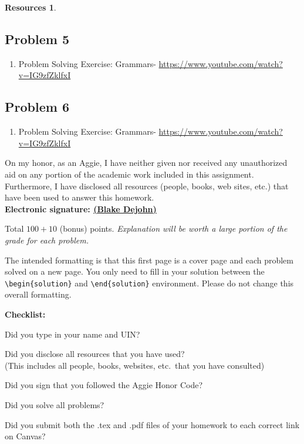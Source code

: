 \documentclass{article}
\theoremstyle{definition}
\newtheorem*{solution}{Solution}
\newtheorem*{resources}{Resources}
\newcommand{\honor}{\noindent On my honor, as an Aggie, I have neither
  given nor received any unauthorized aid on any portion of the
  academic work included in this assignment. Furthermore, I have
  disclosed all resources (people, books, web sites, etc.) that have
  been used to answer this homework. \\[2ex]
 \textbf{Electronic signature: \underline{ (Blake Dejohn) } } } %
\newcommand{\checklist}{\noindent\textbf{Checklist:}
\begin{compactitem}[$\Box$] 
\item [\checkmark] Did you type in your name and UIN? 
\item [\checkmark] Did you disclose all resources that you have used? \\
(This includes all people, books, websites, etc.\ that you have consulted)
\item [\checkmark] Did you sign that you followed the Aggie Honor Code? 
\item [\checkmark] Did you solve all problems? 
\item [\checkmark] Did you submit both the .tex and .pdf files of your homework to each correct link on Canvas? 
\end{compactitem}
}
\begin{document}
\begin{resources}
\subsection*{Problem 5}
\begin{enumerate}
\item Problem Solving Exercise: Grammars- \url{https://www.youtube.com/watch?v=IG9zfZklfxI}
\end{enumerate}
\subsection*{Problem 6}
\begin{enumerate}
\item Problem Solving Exercise: Grammars- \url{https://www.youtube.com/watch?v=IG9zfZklfxI}
\end{enumerate}
\end{resources}
\honor

\bigskip

\noindent
Total $100+10$ (bonus) points.  \textit{Explanation will be worth a large portion of the grade for each problem.}

\bigskip

\noindent
The intended formatting is that this first page is a cover page and each 
problem solved on a new page. You only need to fill in your solution between 
the \verb|\begin{solution}| and \verb|\end{solution}| environment.  
Please do not change this overall formatting.

\bigskip

\vfill
\checklist
\end{document}
